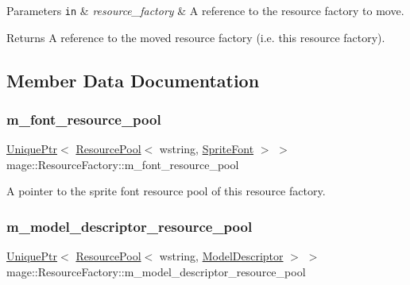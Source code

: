 \begin{DoxyParams}[1]{Parameters}
\mbox{\tt in}  & {\em resource\+\_\+factory} & A reference to the resource factory to move. \\
\hline
\end{DoxyParams}
\begin{DoxyReturn}{Returns}
A reference to the moved resource factory (i.\+e. this resource factory). 
\end{DoxyReturn}


\subsection{Member Data Documentation}
\hypertarget{classmage_1_1_resource_factory_a22db66fbf8dc004124c724770007f056}{}\label{classmage_1_1_resource_factory_a22db66fbf8dc004124c724770007f056} 
\subsubsection{\texorpdfstring{m\+\_\+font\+\_\+resource\+\_\+pool}{m\_font\_resource\_pool}}
{\footnotesize\ttfamily \hyperlink{namespacemage_a8c307fbcc33bce9b7f2aa4c26c3b95cf}{Unique\+Ptr}$<$ \hyperlink{classmage_1_1_resource_pool}{Resource\+Pool}$<$ wstring, \hyperlink{classmage_1_1_sprite_font}{Sprite\+Font} $>$ $>$ mage\+::\+Resource\+Factory\+::m\+\_\+font\+\_\+resource\+\_\+pool\hspace{0.3cm}{\ttfamily [private]}}

A pointer to the sprite font resource pool of this resource factory. \hypertarget{classmage_1_1_resource_factory_a1739407c8918b375e7feaa2240628bde}{}\label{classmage_1_1_resource_factory_a1739407c8918b375e7feaa2240628bde} 
\subsubsection{\texorpdfstring{m\+\_\+model\+\_\+descriptor\+\_\+resource\+\_\+pool}{m\_model\_descriptor\_resource\_pool}}
{\footnotesize\ttfamily \hyperlink{namespacemage_a8c307fbcc33bce9b7f2aa4c26c3b95cf}{Unique\+Ptr}$<$ \hyperlink{classmage_1_1_resource_pool}{Resource\+Pool}$<$ wstring, \hyperlink{classmage_1_1_model_descriptor}{Model\+Descriptor} $>$ $>$ mage\+::\+Resource\+Factory\+::m\+\_\+model\+\_\+descriptor\+\_\+resource\+\_\+pool\hspace{0.3cm}{\ttfamily [private]}}

